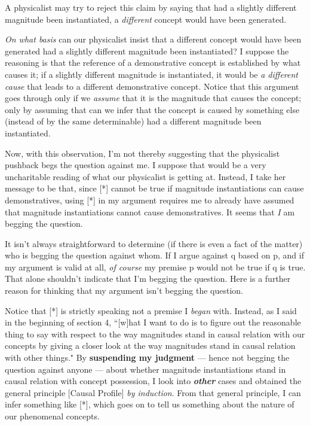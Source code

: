 \documentclass[a4paper,12pt]{article}
\begin{document}
A physicalist may try to reject this claim by saying that had a slightly different magnitude been instantiated, a \emph{different} concept would have been generated.

\emph{On what basis} can our physicalist insist that a different concept would have been generated had a slightly different magnitude been instantiated? I suppose the reasoning is that the reference of a demonstrative concept is established by what causes it; if a slightly different magnitude is instantiated, it would be \emph{a different cause} that leads to a different demonstrative concept. Notice that this argument goes through only if we \emph{assume} that it is the magnitude that causes the concept; only by assuming that can we infer that the concept is caused by something else (instead of by the same determinable) had a different magnitude been instantiated.

Now, with this observation, I'm not thereby suggesting that the physicalist pushback begs the question against me. I suppose that would be a very uncharitable reading of what our physicalist is getting at. Instead, I take her message to be that, since [*] cannot be true if magnitude instantiations can cause demonstratives, using [*] in my argument requires me to already have assumed that magnitude instantiations cannot cause demonstratives. It seems that \emph{I} am begging the question.

It isn't always straightforward to determine (if there is even a fact of the matter) who is begging the question against whom. If I argue against q based on p, and if my argument is valid at all, \emph{of course} my premise p would not be true if q is true. That alone shouldn't indicate that I'm begging the question. Here is a further reason for thinking that my argument isn't begging the question.

Notice that [*] is strictly speaking not a premise I \emph{began} with. Instead, as I said in the beginning of section 4, ``[w]hat I want to do is to figure out the reasonable thing to say with respect to the way magnitudes stand in causal relation with our concepts by giving a closer look at the way magnitudes stand in causal relation with other things." By \textbf{suspending my judgment} --- hence not begging the question against anyone --- about whether magnitude instantiations stand in causal relation with concept possession, I look into \textbf{\emph{other}} cases and obtained the general principle [Causal Profile] \emph{by induction}. From that general principle, I can infer something like [*], which goes on to tell us something about the nature of our phenomenal concepts.
\end{document}
